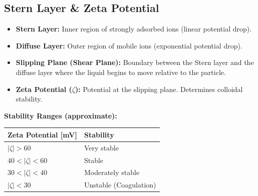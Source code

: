 \subsection{Stern Layer \& Zeta Potential}
\begin{itemize}
    \item \textbf{Stern Layer:} Inner region of strongly adsorbed ions (linear potential drop).
    \item \textbf{Diffuse Layer:} Outer region of mobile ions (exponential potential drop).
    \item \textbf{Slipping Plane (Shear Plane):} Boundary between the Stern layer and the diffuse layer where the liquid begins to move relative to the particle.
    \item \textbf{Zeta Potential ($\zeta$):} Potential at the slipping plane. Determines colloidal stability.
\end{itemize}

\textbf{Stability Ranges (approximate):}
\begin{center}
\begin{tabular}{l l}
\toprule
\textbf{Zeta Potential [mV]} & \textbf{Stability} \\
\midrule
$|\zeta| > 60$ & Very stable \\
$40 < |\zeta| < 60$ & Stable \\
$30 < |\zeta| < 40$ & Moderately stable \\
$|\zeta| < 30$ & Unstable (Coagulation) \\
\bottomrule
\end{tabular}
\end{center}

